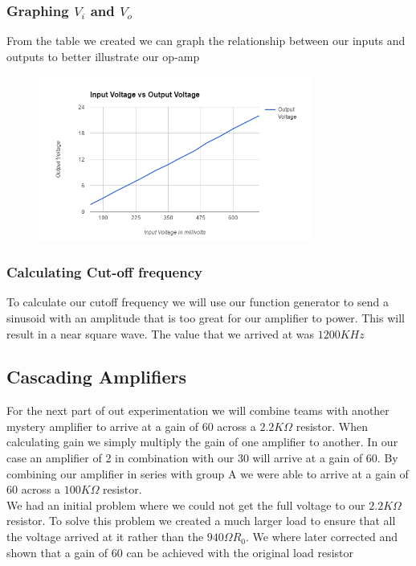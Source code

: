 \documentclass[12pt]{article}
\begin{document}
\subsubsection{Graphing $V_i$ and $V_o$}	
From the table we created we can graph the relationship between our inputs and outputs to better illustrate our op-amp

\begin{figure}[!h]
	\centering
	\includegraphics[width=0.8\textwidth]{graph1.png}
	\label{fig:lab2_graph}
\end{figure}

\subsubsection{Calculating Cut-off frequency}

To calculate our cutoff frequency we will use our function generator to send a sinusoid with an amplitude that is too great for our amplifier to power. This will result in a near square wave. The value that we arrived at was $1200KHz$

\subsection{Cascading Amplifiers}
For the next part of out experimentation we will combine teams with another mystery amplifier to arrive at a gain of 60 across a $2.2K\Omega$ resistor. When calculating gain we simply multiply the gain of one amplifier to another. In our case an amplifier of 2 in combination with our 30 will arrive at a gain of 60. By combining our amplifier in series with group A we were able to arrive at a gain of 60 across a $100K\Omega$ resistor. \\

We had an initial problem where we could not get the full voltage to our $2.2K\Omega$ resistor. To solve this problem we created a much larger load to ensure that all the voltage arrived at it rather than the $940\Omega R_0$. We where later corrected and shown that a gain of 60 can be achieved with the original load resistor
\end{document}
